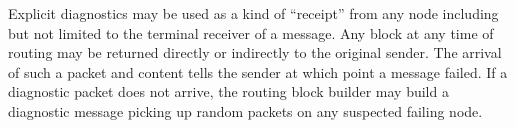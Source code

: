 \documentclass[runningheads]{llncs}
\begin{document}
Explicit diagnostics may be used as a kind of ``receipt'' from any node including but not limited to the terminal receiver of a message. Any block at any time of routing may be returned directly or indirectly to the original sender. The arrival of such a packet and content tells the sender at which point a message failed. If a diagnostic packet does not arrive, the routing block builder may build a diagnostic message picking up random packets on any suspected failing node.

%
%



%
%
\end{document}
